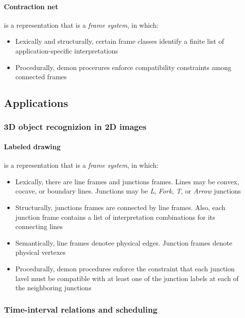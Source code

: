\documentclass{article}
\begin{document}
\paragraph{Contraction net} is a representation that is a \textit{frame
system}, in which:
\begin{itemize}
  \item Lexically and structurally, certain frame classes
    identify a finite list of application-specific
    interpretations
  \item Procedurally, demon procerures enforce compatibility
    constraints among connected frames
\end{itemize}

\subsection{Applications}

\subsubsection{3D object recognizion in 2D images}

\paragraph{Labeled drawing} is a representation that is a \textit{frame
system}, in which:
\begin{itemize}
  \item Lexically, there are line frames and junctions frames.
    Lines may be convex, cocave, or boundary lines. Junctions may
    be \textit{L}, \textit{Fork}, \textit{T}, or \textit{Arrow}
    junctions
  \item Structurally, junctions frames are connected by line
    frames. Also, each junction frame contains a list of
    interpretation combinations for its connecting lines
  \item Semantically, line frames denotee physical edges.
    Junction frames denote physical vertexes
  \item Procedurally, demon procedures enforce the constraint
    that each junction lavel must be compatible with at least one
    of the junction labels at each of the neighboring junctions
\end{itemize}

\subsubsection{Time-interval relations and scheduling}
\end{document}
